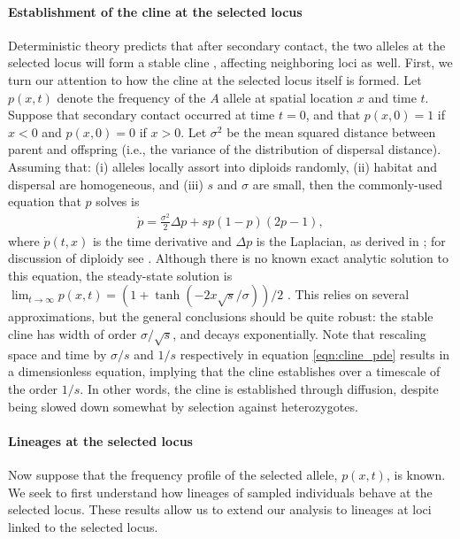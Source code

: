 \documentclass[11pt,letterpaper]{article}
\begin{document}
\paragraph{Establishment of the cline at the selected locus}
Deterministic theory predicts that after secondary contact,
the two alleles at the selected locus will form a stable cline \citep{Barton1979},
affecting neighboring loci as well.
First, we turn our attention to how the cline at the selected locus itself is formed.
Let $p(x,t)$ denote the frequency of the $A$ allele at spatial location $x$ and time $t$.  
Suppose that secondary contact occurred at time $t=0$, 
and that $p(x,0) = 1$ if $x<0$ and $p(x,0)=0$ if $x>0$.
Let $\sigma^2$ be the mean squared distance between parent and offspring 
(i.e., the variance of the distribution of dispersal distance).
Assuming that: (i) alleles locally assort into diploids randomly, 
(ii) habitat and dispersal are homogeneous, and 
(iii) $s$ and $\sigma$ are small, then the commonly-used equation that $p$ solves is
\begin{align} \label{eqn:cline_pde}
    \dot p = \frac{\sigma^2}{2} \Delta p + s p (1-p) (2p-1) ,
\end{align}
where $\dot p(t,x)$ is the time derivative and $\Delta p$ is the Laplacian,
as derived in \citet{Bazykin1969}; for discussion of diploidy see \citet{christiansen1995genotypic}.
Although there is no known exact analytic solution to this equation, 
the steady-state solution is
$\lim_{t \to \infty} p(x,t) = (1+\tanh(-2x\sqrt{s}/\sigma))/2$ \citep{Bazykin1969}. 
This relies on several approximations, but the general conclusions should be quite robust: 
the stable cline has width of order $\sigma/\sqrt{s}$, and decays exponentially. 
Note that rescaling space and time by $\sigma/s$ and $1/s$ respectively in equation \eqref{eqn:cline_pde} results in a dimensionless equation,
implying that the cline establishes over a timescale of the order $1/s$. 
In other words, the cline is established through diffusion, despite being slowed down somewhat by selection against heterozygotes. 



\paragraph{Lineages at the selected locus}
Now suppose that the frequency profile of the selected allele, $p(x,t)$, is known.
We seek to first understand how lineages of sampled individuals behave at the selected locus. 
These results allow us to extend our analysis to lineages at loci linked to the selected locus. 
\end{document}
